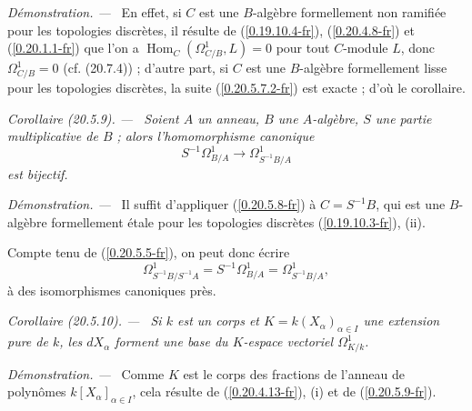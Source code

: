 \documentclass[10pt,oneside]{book}
\makeatletter
\newcommand{\sref}[1]{(\ref{#1})}
\newcommand{\setmanualcurrentlabel}[1]{\def\@currentlabel{#1}}
\newenvironment{corollary}[1][]{%
  \setmanualcurrentlabel{#1}\par\medskip\noindent\itshape Corollaire (#1). ---\ }{\par}
\newenvironment{proof}{%
  \par\medskip\noindent\textit{Démonstration. ---\ }}{\par}
\makeatother
\begin{document}
\begin{proof}
En effet, si $C$ est une $B$-algèbre formellement non ramifiée pour les
topologies discrètes, il résulte de \sref{0.19.10.4-fr},
\sref{0.20.4.8-fr} et \sref{0.20.1.1-fr} que l'on a
$\operatorname{Hom}_C(\Omega^1_{C/B},L)=0$ pour tout $C$-module $L$, donc
$\Omega^1_{C/B}=0$ (cf. (20.7.4)) ; d'autre part, si $C$ est une
$B$-algèbre formellement lisse pour les topologies discrètes, la suite
\sref{0.20.5.7.2-fr} est exacte ; d'où le corollaire.
\end{proof}

\begin{corollary}[20.5.9]
\label{0.20.5.9-fr}
Soient $A$ un anneau, $B$ une $A$-algèbre, $S$ une partie multiplicative de
$B$ ; alors l'homomorphisme canonique
\begin{equation}
\tag{20.5.9.1}
\label{0.20.5.9.1-fr}
  S^{-1}\Omega^1_{B/A}\to\Omega^1_{S^{-1}B/A}
\end{equation}
est bijectif.
\end{corollary}

\begin{proof}
Il suffit d'appliquer \sref{0.20.5.8-fr} à $C=S^{-1}B$, qui est une
$B$-algèbre formellement étale pour les topologies discrètes
\sref{0.19.10.3-fr}, (ii).
\end{proof}

Compte tenu de \sref{0.20.5.5-fr}, on peut donc écrire
\begin{equation}
\tag{20.5.9.2}
\label{0.20.5.9.2-fr}
  \Omega^1_{S^{-1}B/S^{-1}A}
  =S^{-1}\Omega^1_{B/A}
  =\Omega^1_{S^{-1}B/A},
\end{equation}
à des isomorphismes canoniques près.

\begin{corollary}[20.5.10]
\label{0.20.5.10-fr}
Si $k$ est un corps et $K=k(X_\alpha)_{\alpha\in I}$ une extension pure de
$k$, les $dX_\alpha$ forment une base du $K$-espace vectoriel
$\Omega^1_{K/k}$.
\end{corollary}

\begin{proof}
Comme $K$ est le corps des fractions de l'anneau de polynômes
$k[X_\alpha]_{\alpha\in I}$, cela résulte de \sref{0.20.4.13-fr}, (i) et de
\sref{0.20.5.9-fr}.
\end{proof}
\end{document}

